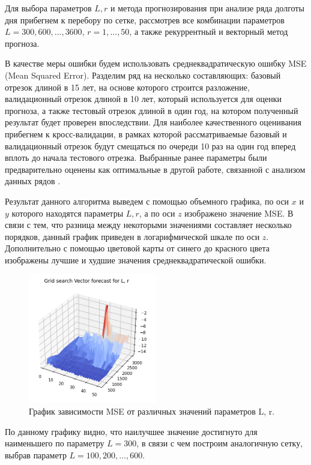 \documentclass[specialist,
			   substylefile = spbu_report.rtx,
			   subf,href,colorlinks=true, 12pt]{disser}
\begin{document}
Для выбора параметров $L, r$ и метода прогнозирования при анализе ряда долготы дня прибегнем к перебору по сетке, рассмотрев все комбинации параметров $L = 300, 600, \dots, 3600$, $r = 1, \dots, 50$, а также рекуррентный и векторный метод прогноза.

В качестве меры ошибки будем использовать среднеквадратическую ошибку MSE (Mean Squared Error). Разделим ряд на несколько составляющих: базовый отрезок длиной в 15 лет, на основе которого строится разложение, валидационный отрезок длиной в 10 лет, который используется для оценки прогноза, а также тестовый отрезок длиной в один год, на котором полученный результат будет проверен впоследствии. Для наиболее качественного оценивания прибегнем к кросс-валидации, в рамках которой рассматриваемые базовый и валидационный отрезок будут смещаться по очереди 10 раз на один год вперед вплоть до начала тестового отрезка. Выбранные ранее параметры были предварительно оценены как оптимальные в другой работе, связанной с анализом данных рядов \cite{eop-analysis}. 

Результат данного алгоритма выведем с помощью объемного графика, по оси $x$ и $y$ которого находятся параметры $L, r$, а по оси $z$ изображено значение MSE. В связи с тем, что разница между некоторыми значениями составляет несколько порядков, данный график приведен в логарифмической шкале по оси $z$. Дополнительно с помощью цветовой карты от синего до красного цвета изображены лучшие и худшие значения среднеквадратической ошибки.

\begin{figure}[H]
	\centering
	\includegraphics[width=0.5\textwidth]{py_lod_for_cv}
	\caption{График зависимости MSE от различных значений параметров L, r.}
	\label{fig:py_lod_for_cv}
\end{figure}

По данному графику видно, что наилучшее значение достигнуто для наименьшего по параметру $L = 300$, в связи с чем построим аналогичную сетку, выбрав параметр $L = 100, 200, \dots, 600$. 
\end{document}
